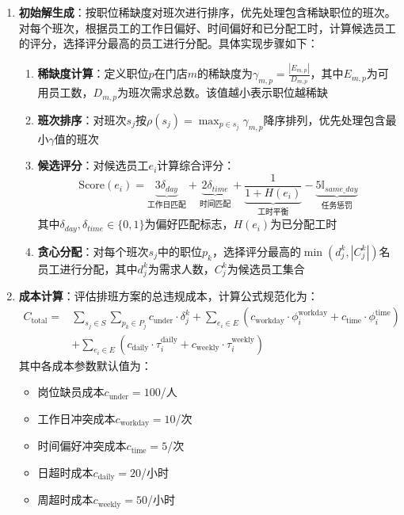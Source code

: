 \begin{enumerate}
    \item \textbf{初始解生成}：按职位稀缺度对班次进行排序，优先处理包含稀缺职位的班次。对每个班次，根据员工的工作日偏好、时间偏好和已分配工时，计算候选员工的评分，选择评分最高的员工进行分配。具体实现步骤如下：
    \begin{enumerate}
        \item \textbf{稀缺度计算}：定义职位$p$在门店$m$的稀缺度为$\gamma_{m,p}=\frac{|E_{m,p}|}{D_{m,p}}$，其中$E_{m,p}$为可用员工数，$D_{m,p}$为班次需求总数。该值越小表示职位越稀缺
        
        \item \textbf{班次排序}：对班次$s_j$按$\rho(s_j)=\max_{p\in s_j}\gamma_{m,p}$降序排列，优先处理包含最小$\gamma$值的班次
        
        \item \textbf{候选评分}：对候选员工$e_i$计算综合评分：
        \begin{equation}
            \text{Score}(e_i) = \underbrace{3\delta_{day}}_{\text{工作日匹配}} + \underbrace{2\delta_{time}}_{\text{时间匹配}} + \underbrace{\frac{1}{1+H(e_i)}}_{\text{工时平衡}} - \underbrace{5\mathbb{I}_{same\_day}}_{\text{任务惩罚}}
        \end{equation}
        其中$\delta_{day},\delta_{time}\in\{0,1\}$为偏好匹配标志，$H(e_i)$为已分配工时
        
        \item \textbf{贪心分配}：对每个班次$s_j$中的职位$p_k$，选择评分最高的$\min(d_j^k, |C_j^k|)$名员工进行分配，其中$d_j^k$为需求人数，$C_j^k$为候选员工集合
    \end{enumerate}
    
    \item \textbf{成本计算}：评估排班方案的总违规成本，计算公式规范化为：
    \begin{equation}
    \begin{split}
    C_{\text{total}} = & \sum_{s_j \in S}\sum_{p_k \in P_j} c_{\text{under}} \cdot \delta_j^k + \sum_{e_i \in E}\left(c_{\text{workday}} \cdot \phi_i^{\text{workday}} + c_{\text{time}} \cdot \phi_i^{\text{time}}\right) \\
                      & + \sum_{e_i \in E}\left(c_{\text{daily}} \cdot \tau_i^{\text{daily}} + c_{\text{weekly}} \cdot \tau_i^{\text{weekly}}\right)
    \end{split}
    \end{equation}
    其中各成本参数默认值为：
    \begin{itemize}
        \item 岗位缺员成本$c_{\text{under}}=100$/人
        \item 工作日冲突成本$c_{\text{workday}}=10$/次
        \item 时间偏好冲突成本$c_{\text{time}}=5$/次
        \item 日超时成本$c_{\text{daily}}=20$/小时
        \item 周超时成本$c_{\text{weekly}}=50$/小时
    \end{itemize}
    

\end{enumerate}
